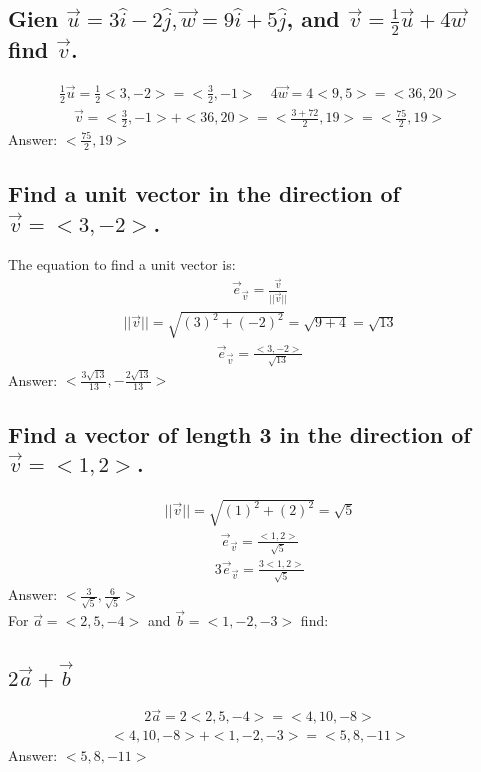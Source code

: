 \documentclass{article}
\begin{document}
\subsection{Gien $\vec{u} = 3\hat{i} - 2\hat{j}, \vec{w} = 9\hat{i} + 5\hat{j}$, and $\vec{v} = \frac{1}{2}\vec{u} + 4\vec{w}$ find $\vec{v}$.}
\begin{align*}
	\frac{1}{2}\vec{u} = \frac{1}{2}<3, -2> = <\frac{3}{2}, -1> \quad 4\vec{w} = 4<9, 5> = <36, 20>
\end{align*}
\begin{align*}
	\vec{v} = <\frac{3}{2}, -1> + <36, 20> = <\frac{3 + 72}{2}, 19> = <\frac{75}{2}, 19>
\end{align*}
Answer: $<\frac{75}{2}, 19>$
\subsection{Find a unit vector in the direction of $\vec{v} = <3,-2>$.}
The equation to find a unit vector is:
\begin{align*}
	\vec{e}_{\vec{v}} = \frac{\vec{v}}{|| \vec{v} ||}
\end{align*}
\begin{align*}
	|| \vec{v} || = \sqrt{(3)^2 + (-2)^2} = \sqrt{9 + 4} = \sqrt{13}
\end{align*}
\begin{align*}
	\vec{e}_{\vec{v}} = \frac{<3, -2>}{\sqrt{13}}
\end{align*}
Answer: $<\frac{3\sqrt{13}}{13}, -\frac{2\sqrt{13}}{13}>$
\subsection{Find a vector of length 3 in the direction of $\vec{v} = <1,2>$.}
\begin{align*}
	|| \vec{v} || = \sqrt{(1)^2 + (2)^2} = \sqrt{5}
\end{align*}
\begin{align*}
	\vec{e}_{\vec{v}} = \frac{<1, 2>}{\sqrt{5}}
\end{align*}
\begin{align*}
	3 \vec{e}_{\vec{v}} = \frac{3<1, 2>}{\sqrt{5}}
\end{align*}
Answer: $<\frac{3}{\sqrt{5}}, \frac{6}{\sqrt{5}}>$  \\[10pt]
For $\vec{a} = <2, 5, -4>$ and $\vec{b} = <1, -2, -3>$ find:
\subsection{$2\vec{a} + \vec{b}$}
\begin{align*}
	2\vec{a} = 2<2, 5, -4> = <4, 10, -8>
\end{align*}
\begin{align*}
	<4, 10, -8> + <1, -2, -3> = <5, 8, -11>
\end{align*}
Answer: $<5, 8, -11>$
\end{document}
